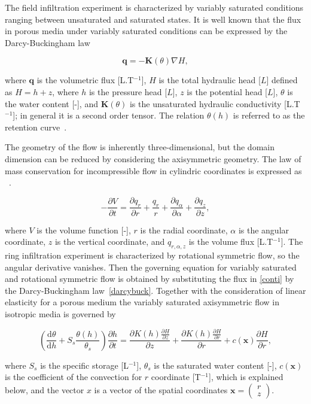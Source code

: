 \documentclass[review]{elsarticle}
\newenvironment{lineq}
    {\begin{linenomath*}
    \begin{equation}
    }
    { 
    \end{equation} 
    \end{linenomath*}
    }
\newcommand{\dd}{\mathrm{d}}
\renewcommand{\vec}{\mathbf}
\begin{document}
The field infiltration experiment is characterized by variably saturated conditions ranging between unsaturated and saturated states. It is well known that the flux in porous media under variably saturated conditions can be expressed by the Darcy-Buckingham law~\citep{buckingham} \begin{lineq}\label{darcybuck}\vec{q} = -\mathbf{K}(\theta) \nabla H,\end{lineq} where $\vec{q}$ is the volumetric flux [L.T$^{-1}$], $H$ is the total hydraulic head [$L$] defined as $H=h+z$, where $h$ is the pressure head [$L$], $z$ is the potential head [$L$], $\theta$ is the water content [-], and $\mathbf{K}(\theta)$ is the unsaturated hydraulic conductivity  [L.T$^{-1}$]; in general it is a  second order tensor. The relation $\theta(h)$ is referred to as the retention curve~\citep{vangenuchten}.

The geometry of the flow is inherently three-dimensional, but the domain dimension can be reduced by considering the axisymmetric geometry. The law of mass conservation  for incompressible flow in cylindric coordinates is expressed as ~\citep{bear1979}.
\begin{lineq}
\label{conti}
-\frac{\partial V}{\partial t} = \frac{\partial q_r}{\partial r} + \frac{q_r}{r} + \frac{\partial q_{\alpha}}{\partial \alpha} + \frac{\partial q_z}{\partial z} ,
\end{lineq}
where $V$ is the volume function [-],  $r$ is the radial coordinate, $\alpha$ is the angular coordinate,  $z$ is the vertical coordinate, and $q_{r, \alpha, z}$ is the  volume flux [L.T$^{-1}$]. The ring infiltration experiment is characterized by rotational symmetric flow, so the angular derivative vanishes. Then the governing equation for  variably saturated and rotational symmetric flow is obtained by substituting the flux in \eqref{conti} by the Darcy-Buckingham law~\eqref{darcybuck}. Together with the consideration of linear elasticity for a porous medium the variably saturated axisymmetric flow in isotropic media is governed by
\begin{lineq}
\label{richaxi}
\left(\frac{\dd \theta}{\dd h} + S_s\frac{\theta(h)}{\theta_s} \right) \frac{\partial h}{\partial t}  =  \frac{\partial K(h) \frac{\partial H}{\partial z}}{\partial z} + \frac{\partial K(h) \frac{\partial H}{\partial r}}{\partial r} + c(\vec{x})\frac{\partial H}{\partial r},
\end{lineq}
where $S_s$ is the specific storage [L$^{-1}$], $\theta_s$ is the saturated water content [-],  $c(\vec{x})$ is the coefficient of the convection for $r$ coordinate [T$^{-1}$], which is explained below, and the vector $x$ is a vector of the spatial coordinates $\vec{x}=\left( \begin{smallmatrix} r \\ z \end{smallmatrix} \right)$.
\end{document}
